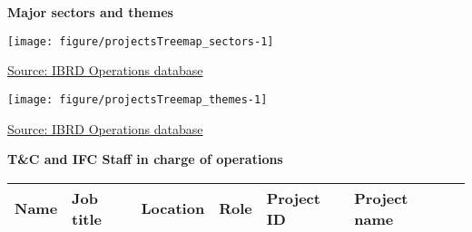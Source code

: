 \documentclass{article}\usepackage[]{graphicx}\usepackage[]{color}
\makeatletter
\def\maxwidth{ %
  \ifdim\Gin@nat@width>\linewidth
    \linewidth
  \else
    \Gin@nat@width
  \fi
}
\makeatother
\begin{document}
 \newpage
\begin{minipage}[t]{0.99\textwidth}
\raggedright{\color{white!30!blue} \textbf{\large Major sectors and themes}}
     \vspace*{0.5cm}
     
  \begin{minipage}[c]{0.49\textwidth} %
    \vspace*{0.4cm}


{\centering \texttt{[image: figure/projectsTreemap\_sectors-1]} 

}



    \hspace*{0.3cm} \raggedright\footnotesize{\href{http://www.weforum.org/reports/global-competitiveness-report-2015-2016}{Source: IBRD Operations database}}
  \end{minipage}
  \begin{minipage}[c]{0.49\textwidth} %
    \vspace*{0.4cm}


{\centering \texttt{[image: figure/projectsTreemap\_themes-1]} 

}



  \raggedright{\footnotesize{\href{http://lpi.worldbank.org}{Source: IBRD Operations database}}}
  \end{minipage}
\end{minipage}  
 
\begin{minipage}[b]{0.99\textwidth}
  \vspace*{1cm}
  \raggedright{\color{white!30!blue} \textbf{\large T\&C and IFC Staff in charge of operations}}
  \vspace*{0.5cm}
     
{\small
\begin{longtable}{>{\raggedright}p{1.4in}>{\raggedright}p{1in}>{\raggedright}p{1in}>{\raggedright}p{1in}l>{\raggedright}p{1.5in}l}
 Name & Job title & Location & Role & Project ID & Project name &  \\ 
  \hline
\hline
\end{longtable}
}

     \vspace*{0.5cm}
\end{minipage}

\end{document}

